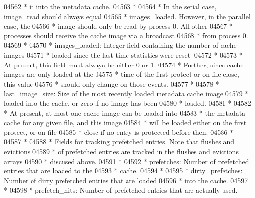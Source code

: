 \begin{DoxyCode}
04562 \textcolor{comment}{ *              it into the metadata cache.}
04563 \textcolor{comment}{ *}
04564 \textcolor{comment}{ *              In the serial case, image\_read should always equal }
04565 \textcolor{comment}{ *              images\_loaded.  However, in the parallel case, the }
04566 \textcolor{comment}{ *              image should only be read by process 0.  All other }
04567 \textcolor{comment}{ *              processes should receive the cache image via a broadcast}
04568 \textcolor{comment}{ *              from process 0.}
04569 \textcolor{comment}{ *}
04570 \textcolor{comment}{ * images\_loaded:  Integer field containing the number of cache images}
04571 \textcolor{comment}{ *      loaded since the last time statistics were reset.}
04572 \textcolor{comment}{ *}
04573 \textcolor{comment}{ *      At present, this field must always be either 0 or 1.}
04574 \textcolor{comment}{ *      Further, since cache images are only loaded at the }
04575 \textcolor{comment}{ *      time of the first protect or on file close, this value}
04576 \textcolor{comment}{ *      should only change on those events.}
04577 \textcolor{comment}{ *}
04578 \textcolor{comment}{ * last\_image\_size:  Size of the most recently loaded metadata cache image}
04579 \textcolor{comment}{ *             loaded into the cache, or zero if no image has been}
04580 \textcolor{comment}{ *             loaded.  }
04581 \textcolor{comment}{ *}
04582 \textcolor{comment}{ *             At present, at most one cache image can be loaded into }
04583 \textcolor{comment}{ *             the metadata cache for any given file, and this image}
04584 \textcolor{comment}{ *             will be loaded either on the first protect, or on file}
04585 \textcolor{comment}{ *             close if no entry is protected before then.}
04586 \textcolor{comment}{ *}
04587 \textcolor{comment}{ *}
04588 \textcolor{comment}{ * Fields for tracking prefetched entries.  Note that flushes and evictions}
04589 \textcolor{comment}{ * of prefetched entries are tracked in the flushes and evictions arrays }
04590 \textcolor{comment}{ * discused above.}
04591 \textcolor{comment}{ *}
04592 \textcolor{comment}{ * prefetches:  Number of prefetched entries that are loaded to the }
04593 \textcolor{comment}{ *      cache.}
04594 \textcolor{comment}{ *}
04595 \textcolor{comment}{ * dirty\_prefetches:  Number of dirty prefetched entries that are loaded}
04596 \textcolor{comment}{ *      into the cache.}
04597 \textcolor{comment}{ *}
04598 \textcolor{comment}{ * prefetch\_hits:  Number of prefetched entries that are actually used.}

\end{DoxyCode}
